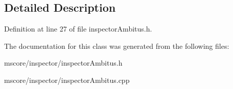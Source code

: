 \subsection{Detailed Description}


Definition at line 27 of file inspector\+Ambitus.\+h.



The documentation for this class was generated from the following files\+:\begin{DoxyCompactItemize}
\item 
mscore/inspector/inspector\+Ambitus.\+h\item 
mscore/inspector/inspector\+Ambitus.\+cpp\end{DoxyCompactItemize}
